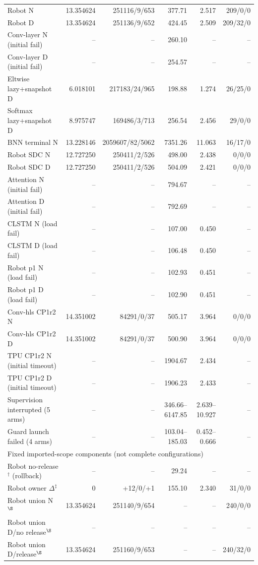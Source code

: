 \documentclass[conference,10pt]{IEEEtran}
\begin{document}
\begin{table}[t]
\begin{tabular}{lrrrrr}
Robot N&13.354624&251116/9/653&377.71&2.517&209/0/0\\
Robot D&13.354624&251136/9/652&424.45&2.509&209/32/0\\
Conv-layer N (initial fail)&--&--&260.10&--&--\\
Conv-layer D (initial fail)&--&--&254.57&--&--\\
Eltwise lazy+snapshot D&6.018101&217183/24/965&198.88&1.274&26/25/0\\
Softmax lazy+snapshot D&8.975747&169486/3/713&256.54&2.456&29/0/0\\\hline
BNN terminal N&13.228146&2059607/82/5062&7351.26&11.063&16/17/0\\
Robot SDC N&12.727250&250411/2/526&498.00&2.438&0/0/0\\
Robot SDC D&12.727250&250411/2/526&504.09&2.421&0/0/0\\
Attention N (initial fail)&--&--&794.67&--&--\\
Attention D (initial fail)&--&--&792.69&--&--\\\hline
CLSTM N (load fail)&--&--&107.00&0.450&--\\
CLSTM D (load fail)&--&--&106.48&0.450&--\\
Robot p1 N (load fail)&--&--&102.93&0.451&--\\
Robot p1 D (load fail)&--&--&102.90&0.451&--\\\hline
Conv-hls CP1r2 N&14.351002&84291/0/37&505.17&3.964&0/0/0\\
Conv-hls CP1r2 D&14.351002&84291/0/37&500.90&3.964&0/0/0\\
TPU CP1r2 N (initial timeout)&--&--&1904.67&2.434&--\\
TPU CP1r2 D (initial timeout)&--&--&1906.23&2.433&--\\
Supervision interrupted (5 arms)&--&--&346.66--6147.85&2.639--10.927&--\\
Guard launch failed (4 arms)&--&--&103.04--185.03&0.452--0.666&--\\
\hline
\multicolumn{6}{l}{Fixed imported-scope components (not complete configurations)}\\

Robot no-release$^{\dagger}$ (rollback)&--&--&29.24&--&--\\
Robot owner $\Delta^{\ddagger}$&0&+12/0/+1&155.10&2.340&31/0/0\\
Robot union N$^{\S}$&13.354624&251140/9/654&--&--&240/0/0\\
Robot union D/no release$^{\S}$&--&--&--&--&--\\
Robot union D/release$^{\S}$&13.354624&251160/9/653&--&--&240/32/0\\\hline
\end{tabular}
\end{table}
\end{document}

